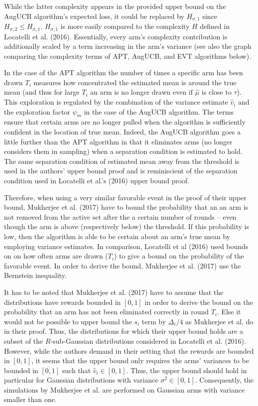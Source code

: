 \documentclass[12pt,]{article}
\begin{document}
While the latter complexity appears in the provided upper bound on the
AugUCB algorithm's expected loss, it could be replaced by
\(H_{\sigma, 1}\) since \(H_{\sigma, 2} \leq H_{\sigma,1}\).
\(H_{\sigma,1}\) is more easily compared to the complexity \(H\) defined
in Locatelli et al. (2016). Essentially, every arm's complexity
contribution is additionally scaled by a term increasing in the arm's
variance (see also the graph comparing the complexity terms of APT,
AugUCB, and EVT algorithms below).

In the case of the APT algorithm the number of times a specific arm has
been drawn \(T_i\) measures how concentrated the estimated mean is
around the true mean (and thus for large \(T_i\) an arm is no longer
drawn even if \(\hat{\mu}\) is close to \(\tau\)). This exploration is
regulated by the combination of the variance estimate \(\hat{v}_i\) and
the exploration factor \(\psi_m\) in the case of the AugUCB algorithm.
The terms ensure that certain arms are no longer pulled when the
algorithm is sufficiently confident in the location of true mean.
Indeed, the AugUCB algorithm goes a little further than the APT
algorithm in that it eliminates arms (no longer considers them in
sampling) when a separation condition is estimated to hold. The same
separation condition of estimated mean away from the threshold is used
in the authors' upper bound proof and is reminiscient of the separation
condition used in Locatelli et al.'s (2016) upper bound proof.

Therefore, when using a very similar favorable event in the proof of
their upper bound, Mukherjee et al. (2017) have to bound the probability
that an an arm is not removed from the active set after the a certain
number of rounds -- even though the arm is above (respectively below)
the threshold. If this probability is low, then the algorithm is able to
be certain about an arm's true mean by employing variance estimates. In
comparison, Locatelli et al (2016) used bounds on on how often arms are
drawn (\(T_i\)) to give a bound on the probability of the favorable
event. In order to derive the bound, Mukherjee et al. (2017) use the
Bernstein inequality.

It has to be noted that Mukherjee et al. (2017) have to assume that the
distributions have rewards bounded in \([0,1]\) in order to derive the
bound on the probability that an arm has not been eliminated correctly
in round \(T_i\). Else it would not be possible to upper bound the
\(s_i\) term by \(\Delta_i/4\) as Mukherjee et al. do in their proof.
Thus, the distributions for which their upper bound holds are a subset
of the \(R\)-sub-Gaussian distributions considered in Locatelli et al.
(2016). However, while the authors demand in their setting that the
rewards are bounded in \([0,1]\), it seems that the upper bound only
requires the arms' variances to be bounded in \([0,1]\) such that
\(\hat{v}_i \in [0,1]\). Thus, the upper bound should hold in particular
for Gaussian distributions with variance \(\sigma^2 \in [0,1]\).
Consequently, the simulations by Mukherjee et al. are performed on
Gaussian arms with variance smaller than one.
\end{document}
